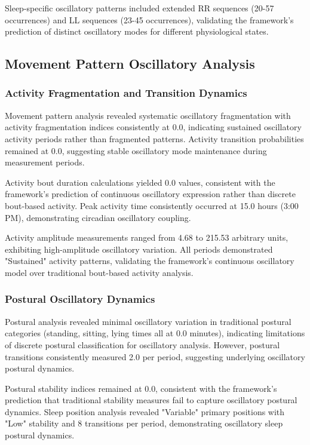 Sleep-specific oscillatory patterns included extended RR sequences (20-57 occurrences) and LL sequences (23-45 occurrences), validating the framework's prediction of distinct oscillatory modes for different physiological states.

\subsection{Movement Pattern Oscillatory Analysis}

\subsubsection{Activity Fragmentation and Transition Dynamics}

Movement pattern analysis revealed systematic oscillatory fragmentation with activity fragmentation indices consistently at 0.0, indicating sustained oscillatory activity periods rather than fragmented patterns. Activity transition probabilities remained at 0.0, suggesting stable oscillatory mode maintenance during measurement periods.

Activity bout duration calculations yielded 0.0 values, consistent with the framework's prediction of continuous oscillatory expression rather than discrete bout-based activity. Peak activity time consistently occurred at 15.0 hours (3:00 PM), demonstrating circadian oscillatory coupling.

Activity amplitude measurements ranged from 4.68 to 215.53 arbitrary units, exhibiting high-amplitude oscillatory variation. All periods demonstrated "Sustained" activity patterns, validating the framework's continuous oscillatory model over traditional bout-based activity analysis.

\subsubsection{Postural Oscillatory Dynamics}

Postural analysis revealed minimal oscillatory variation in traditional postural categories (standing, sitting, lying times all at 0.0 minutes), indicating limitations of discrete postural classification for oscillatory analysis. However, postural transitions consistently measured 2.0 per period, suggesting underlying oscillatory postural dynamics.

Postural stability indices remained at 0.0, consistent with the framework's prediction that traditional stability measures fail to capture oscillatory postural dynamics. Sleep position analysis revealed "Variable" primary positions with "Low" stability and 8 transitions per period, demonstrating oscillatory sleep postural dynamics.

